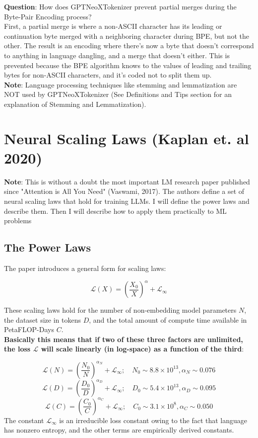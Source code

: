\documentclass[12pt]{article}
\begin{document}
\textbf{Question}: How does GPTNeoXTokenizer prevent partial merges during the Byte-Pair Encoding process? \\
First, a partial merge is where a non-ASCII character has its leading or continuation byte merged with a neighboring character during BPE, but not the other. The result is an encoding where there's now a byte that doesn't correspond to anything in language dangling, and a merge that doesn't either. This is prevented because the BPE algorithm knows to the values of leading and trailing bytes for non-ASCII characters, and it's coded not to split them up.\\

\textbf{Note}: Language processing techniques like stemming and lemmatization are NOT used by GPTNeoXTokenizer (See Definitions and Tips section for an explanation of Stemming and Lemmatization).

\section{Neural Scaling Laws (Kaplan et. al 2020)}
\textbf{Note}: This is without a doubt the most important LM research paper published since "Attention is All You Need" (Vaswami, 2017).  The authors define a set of neural scaling laws that hold for training LLMs. I will define the power laws and describe them. Then I will describe how to apply them practically to ML problems

\subsection{The Power Laws}
The paper introduces a general form for scaling laws:

\[\mathcal{L}(X) = \left(\frac{X_0}{X}\right)^\alpha + \mathcal{L}_\infty\]


These scaling laws hold for the number of non-embedding model parameters \(N\), the dataset size in tokens \(D\), and the total amount of compute time available in PetaFLOP-Days \(C\). \\

\textbf{Basically this means that if two of these three factors are unlimited, the loss \(\mathcal{L}\) will scale linearly (in log-space) as a function of the third}:

\[\mathcal{L}(N) = \left(\frac{N_0}{N}\right)^{\alpha_N} + \mathcal{L}_\infty; \quad N_0 \sim 8.8 \times 10^{13}, \alpha_N \sim 0.076\]
\[\mathcal{L}(D) = \left(\frac{D_0}{D}\right)^{\alpha_D} + \mathcal{L}_\infty; \quad D_0 \sim 5.4 \times 10^{13}, \alpha_D \sim 0.095\]
\[\mathcal{L}(C) = \left(\frac{C_0}{C}\right)^{\alpha_C} + \mathcal{L}_\infty; \quad C_0 \sim 3.1 \times 10^8, \alpha_C \sim 0.050\]
The constant \(\mathcal{L}_\infty\) is an irreducible loss constant owing to the fact that language has nonzero entropy, and the other terms are empirically derived constants.
\end{document}
